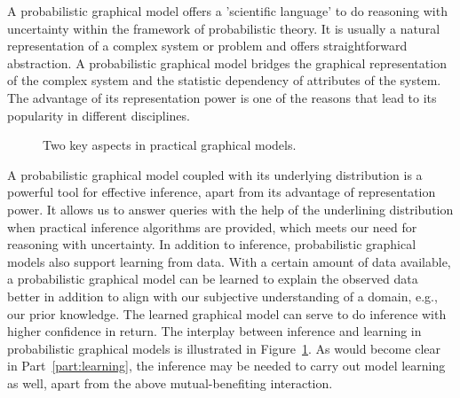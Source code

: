 A probabilistic graphical model offers a 'scientific language' to do reasoning with uncertainty within the framework of probabilistic theory. It is usually a natural representation of a complex system or problem and offers straightforward abstraction. A probabilistic graphical model bridges the graphical representation of the complex system and the statistic dependency of attributes of the system.
The advantage of its representation power is one of the reasons that lead to its popularity in different disciplines.

\begin{figure}[!t]
  \centering
  \caption{Two key aspects in practical graphical models.}
  \label{fig:intro-pgm}
  \hspace{1cm}
\end{figure}

A probabilistic graphical model coupled with its underlying distribution is a powerful tool for effective inference, apart from its advantage of representation power. It allows us to answer queries with the help of the underlining distribution when practical inference algorithms are provided, which meets our need for reasoning with uncertainty. In addition to inference, probabilistic graphical models also support learning from data. With a certain amount of data available, a probabilistic graphical model can be learned to explain the observed data better in addition to align with our subjective understanding of a domain, e.g., our prior knowledge. The learned graphical model can serve to do inference with higher confidence in return. The interplay between inference and learning in probabilistic graphical models is illustrated in Figure~\ref{fig:intro-pgm}. As would become clear in Part~\ref{part:learning}, the inference may be needed to carry out model learning as well, apart from the above mutual-benefiting interaction.




